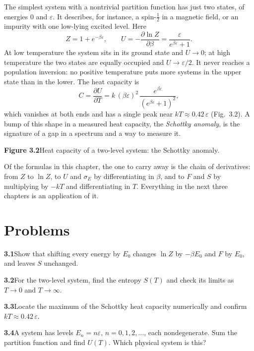\documentclass[10pt,twoside]{book}
\begin{document}
The simplest system with a nontrivial partition function has just two states, of energies $0$ and $\varepsilon$. It describes, for instance, a spin-$\frac12$ in a magnetic field, or an impurity with one low-lying excited level. Here
\begin{equation}
  Z = 1 + e^{-\beta\varepsilon}, \qquad
  U = -\frac{\partial\ln Z}{\partial\beta} = \frac{\varepsilon}{e^{\beta\varepsilon} + 1}.
\end{equation}
At low temperature the system sits in its ground state and $U \to 0$; at high temperature the two states are equally occupied and $U \to \varepsilon/2$. It never reaches a population inversion: no positive temperature puts more systems in the upper state than in the lower. The heat capacity is
\begin{equation}
  C = \frac{\partial U}{\partial T} = k\,(\beta\varepsilon)^2\,\frac{e^{\beta\varepsilon}}{\left(e^{\beta\varepsilon}+1\right)^2} ,
\end{equation}
which vanishes at both ends and has a single peak near $kT \approx 0.42\,\varepsilon$ (Fig.~3.2). A bump of this shape in a measured heat capacity, the \emph{Schottky anomaly}, is the signature of a gap in a spectrum and a way to measure it.

\begin{center}

\small\textbf{Figure 3.2}\enspace Heat capacity of a two-level system: the Schottky anomaly.
\end{center}

Of the formulas in this chapter, the one to carry away is the chain of derivatives: from $Z$ to $\ln Z$, to $U$ and $\sigma_E$ by differentiating in $\beta$, and to $F$ and $S$ by multiplying by $-kT$ and differentiating in $T$. Everything in the next three chapters is an application of it.

\section*{Problems}
\small
\noindent\textbf{3.1}\enspace Show that shifting every energy by $E_0$ changes $\ln Z$ by $-\beta E_0$ and $F$ by $E_0$, and leaves $S$ unchanged.

\smallskip
\noindent\textbf{3.2}\enspace For the two-level system, find the entropy $S(T)$ and check its limits as $T\to 0$ and $T\to\infty$.

\smallskip
\noindent\textbf{3.3}\enspace Locate the maximum of the Schottky heat capacity numerically and confirm $kT \approx 0.42\,\varepsilon$.

\smallskip
\noindent\textbf{3.4}\enspace A system has levels $E_n = n\varepsilon$, $n = 0,1,2,\ldots$, each nondegenerate. Sum the partition function and find $U(T)$. Which physical system is this?
\end{document}
